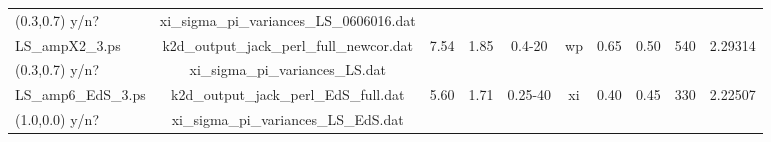 \documentclass[usenatbib]{mn2e}
\begin{document}
\begin{table*}
\begin{center}
\begin{tabular}{lccccccccc}
(0.3,0.7) y/n?  & xi\_sigma\_pi\_variances\_LS\_0606016.dat &               &      &         &      &       &       &      & \\[8pt]
%
LS\_ampX2\_3.ps & k2d\_output\_jack\_perl\_full\_newcor.dat & 7.54	    & 1.85 &  0.4-20 & wp   & 0.65  & 0.50  & 540  & 2.29314 \\
(0.3,0.7) y/n?	& xi\_sigma\_pi\_variances\_LS.dat          &               &      &         &      &       &       &      & \\[16pt]
%
%	
\hline
%
LS\_amp6\_EdS\_3.ps  & k2d\_output\_jack\_perl\_EdS\_full.dat  & 5.60         & 1.71  & 0.25-40 &  xi  & 0.40  & 0.45  & 330  & 2.22507 \\
(1.0,0.0) y/n?	     &  xi\_sigma\_pi\_variances\_LS\_EdS.dat  &              &       &         &      &       &       &      & \\[8pt]


\end{tabular}
\end{center}
\end{table*}
\end{document}
